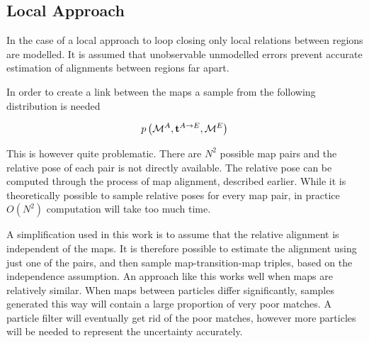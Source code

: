 \subsection{Local Approach}

In the case of a local approach to loop closing only local relations
between regions are modelled. It is assumed that unobservable
unmodelled errors prevent accurate estimation of alignments between
regions far apart.

In order to create a link between the maps a sample from the following
distribution is needed

$$
\prob{\mapA,\tr{}{A}{E},\mapE} 
$$

This is however quite problematic. There are $N^2$ possible map pairs
and the relative pose of each pair is not directly available. The
relative pose can be computed through the process of map alignment,
described earlier. While it is theoretically possible to sample relative
poses for every map pair, in practice $O(N^2)$ computation will take too
much time.

A simplification used in this work is to assume that the relative
alignment is independent of the maps. It is therefore possible to
estimate the alignment using just one of the pairs, and then sample
map-transition-map triples, based on the independence assumption. An
approach like this works well when maps are relatively similar. When
maps between particles differ significantly, samples generated this way
will contain a large proportion of very poor matches. A particle filter
will eventually get rid of the poor matches, however more particles will
be needed to represent the uncertainty accurately.


